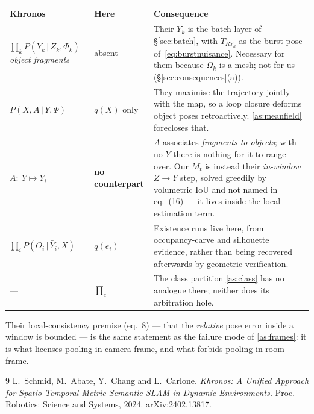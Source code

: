 \documentclass[11pt,a4paper]{report}
\newcommand{\given}{\,|\,}
\theoremstyle{definition}   %
\begin{document}
\begin{center}
\begin{tabular}{@{}p{4.2cm}p{2.2cm}p{7.4cm}@{}}
\toprule
Khronos & Here & Consequence \\
\midrule
$\prod_k P(Y_k\given\bar Z_k,\bar\Phi_k)$ \newline \emph{object fragments} &
absent &
Their $Y_k$ is the batch layer of \S\ref{sec:batch}, with $T_{RY_k}$ as the burst pose
of~\eqref{eq:burstnuisance}. Necessary for them because $\Omega_k$ is a mesh; not for us
(\S\ref{sec:consequences}(a)). \\[4pt]
$P(X,A\given Y,\Phi)$ &
$q(X)$ only &
They maximise the trajectory jointly with the map, so a loop closure deforms object poses
retroactively. \ref{as:meanfield} forecloses that. \\[4pt]
$A:\ Y\mapsto \bar Y_i$ &
\textbf{no counterpart} &
$A$ associates \emph{fragments to objects}; with no $Y$ there is nothing for it to range over.
Our $M_t$ is instead their \emph{in-window} $Z\!\to\!Y$ step, solved greedily by volumetric IoU
and not named in eq.~(16) --- it lives inside the local-estimation term. \\[4pt]
$\prod_i P(O_i\given\bar Y_i,X)$ &
$q(e_i)$ &
Existence runs live here, from occupancy-carve and silhouette evidence, rather than being
recovered afterwards by geometric verification. \\[4pt]
--- & $\prod_{c}$ &
The class partition \ref{as:class} has no analogue there; neither does its arbitration hole. \\
\bottomrule
\end{tabular}
\end{center}

\noindent
Their local-consistency premise (eq.~8) --- that the \emph{relative} pose error inside a window is
bounded --- is the same statement as the failure mode of \ref{as:frames}: it is what licenses
pooling in camera frame, and what forbids pooling in room frame.

\begin{thebibliography}{9}
L.~Schmid, M.~Abate, Y.~Chang and L.~Carlone.
\emph{Khronos: A Unified Approach for Spatio-Temporal Metric-Semantic SLAM in Dynamic
Environments.} Proc. Robotics: Science and Systems, 2024. arXiv:2402.13817.
\end{thebibliography}
\end{document}
